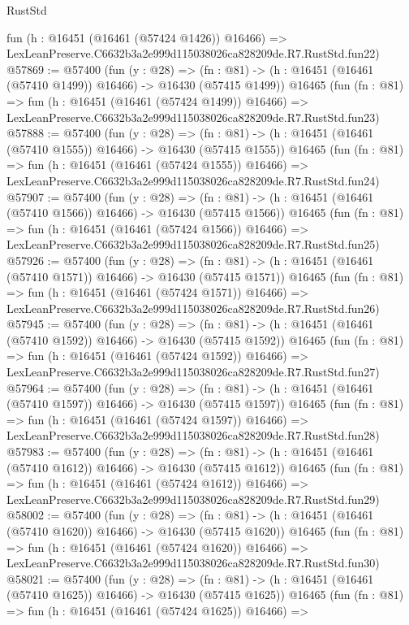 \begin{lexlean}{RustStd}
\begin{coremodule}
    fun (h : @16451 (@16461 (@57424 @1426)) @16466) =>
    LexLeanPreserve.C6632b3a2e999d115038026ca828209de.R7.RustStd.fun22)
@57869 := @57400
    (fun (y : @28) =>
    (fn : @81) -> (h : @16451 (@16461 (@57410 @1499)) @16466) -> @16430 (@57415 @1499))
    @16465
    (fun (fn : @81) =>
    fun (h : @16451 (@16461 (@57424 @1499)) @16466) =>
    LexLeanPreserve.C6632b3a2e999d115038026ca828209de.R7.RustStd.fun23)
@57888 := @57400
    (fun (y : @28) =>
    (fn : @81) -> (h : @16451 (@16461 (@57410 @1555)) @16466) -> @16430 (@57415 @1555))
    @16465
    (fun (fn : @81) =>
    fun (h : @16451 (@16461 (@57424 @1555)) @16466) =>
    LexLeanPreserve.C6632b3a2e999d115038026ca828209de.R7.RustStd.fun24)
@57907 := @57400
    (fun (y : @28) =>
    (fn : @81) -> (h : @16451 (@16461 (@57410 @1566)) @16466) -> @16430 (@57415 @1566))
    @16465
    (fun (fn : @81) =>
    fun (h : @16451 (@16461 (@57424 @1566)) @16466) =>
    LexLeanPreserve.C6632b3a2e999d115038026ca828209de.R7.RustStd.fun25)
@57926 := @57400
    (fun (y : @28) =>
    (fn : @81) -> (h : @16451 (@16461 (@57410 @1571)) @16466) -> @16430 (@57415 @1571))
    @16465
    (fun (fn : @81) =>
    fun (h : @16451 (@16461 (@57424 @1571)) @16466) =>
    LexLeanPreserve.C6632b3a2e999d115038026ca828209de.R7.RustStd.fun26)
@57945 := @57400
    (fun (y : @28) =>
    (fn : @81) -> (h : @16451 (@16461 (@57410 @1592)) @16466) -> @16430 (@57415 @1592))
    @16465
    (fun (fn : @81) =>
    fun (h : @16451 (@16461 (@57424 @1592)) @16466) =>
    LexLeanPreserve.C6632b3a2e999d115038026ca828209de.R7.RustStd.fun27)
@57964 := @57400
    (fun (y : @28) =>
    (fn : @81) -> (h : @16451 (@16461 (@57410 @1597)) @16466) -> @16430 (@57415 @1597))
    @16465
    (fun (fn : @81) =>
    fun (h : @16451 (@16461 (@57424 @1597)) @16466) =>
    LexLeanPreserve.C6632b3a2e999d115038026ca828209de.R7.RustStd.fun28)
@57983 := @57400
    (fun (y : @28) =>
    (fn : @81) -> (h : @16451 (@16461 (@57410 @1612)) @16466) -> @16430 (@57415 @1612))
    @16465
    (fun (fn : @81) =>
    fun (h : @16451 (@16461 (@57424 @1612)) @16466) =>
    LexLeanPreserve.C6632b3a2e999d115038026ca828209de.R7.RustStd.fun29)
@58002 := @57400
    (fun (y : @28) =>
    (fn : @81) -> (h : @16451 (@16461 (@57410 @1620)) @16466) -> @16430 (@57415 @1620))
    @16465
    (fun (fn : @81) =>
    fun (h : @16451 (@16461 (@57424 @1620)) @16466) =>
    LexLeanPreserve.C6632b3a2e999d115038026ca828209de.R7.RustStd.fun30)
@58021 := @57400
    (fun (y : @28) =>
    (fn : @81) -> (h : @16451 (@16461 (@57410 @1625)) @16466) -> @16430 (@57415 @1625))
    @16465
    (fun (fn : @81) =>
    fun (h : @16451 (@16461 (@57424 @1625)) @16466) =>

\end{coremodule}
\end{lexlean}
